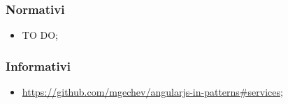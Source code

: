 		\subsubsection{Normativi} %
		\label{ssub:normativi}
			\begin{itemize}
				\item TO DO;
			\end{itemize}

		\subsubsection{Informativi} %
		\label{ssub:informativi}
			\begin{itemize}
				\item \url{https://github.com/mgechev/angularjs-in-patterns#services};
			\end{itemize}
